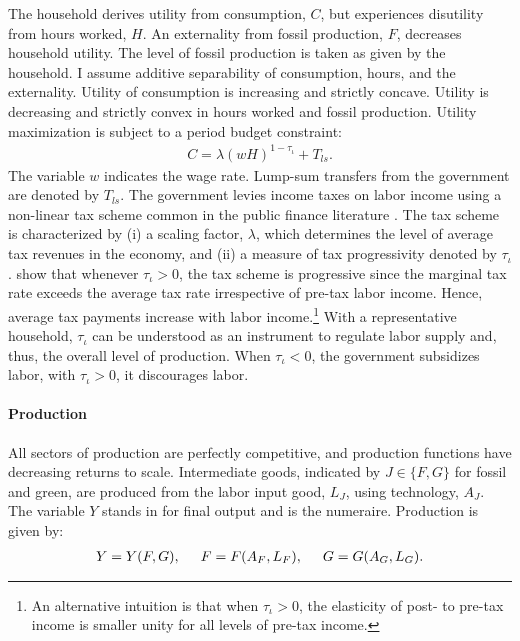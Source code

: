 The household derives utility from consumption, $C$, but experiences disutility from hours worked, $H$. An externality from fossil production, $F$, decreases household utility. The level of fossil production is taken as given by the household.
I assume additive separability of consumption, hours, and the externality. Utility of consumption is increasing and strictly concave. Utility is decreasing and strictly convex in hours worked and fossil production.
Utility maximization is subject to a period budget constraint:
\begin{align}
	 C= \lambda(wH)^{1-\tau_{\iota}}+T_{ls}. \label{eq:hhbudget}
\end{align}
The variable $w$ indicates the wage rate.  Lump-sum transfers from the government are denoted by $T_{ls}$.
The government levies income taxes on labor income using a non-linear tax scheme common in the public finance literature \citep{Heathcote2017OptimalFramework, Benabou2002TaxEfficiency}. The tax scheme is
characterized by (i) a scaling factor, $\lambda$, which determines the level of average tax revenues in the economy, and (ii) a measure of tax progressivity denoted by $\tau_{\iota}$. 
\cite{Heathcote2017OptimalFramework} show that whenever $\tau_{\iota}>0$, the tax scheme is progressive since the marginal tax rate exceeds the average tax rate irrespective of  pre-tax labor income. Hence, average tax payments increase with labor income.\footnote{ An alternative intuition is that when $\tau_{\iota}>0$, the elasticity of post- to pre-tax  income is smaller unity for all levels of pre-tax income.  } %
With a representative household, $\tau_{\iota}$ can be understood as an instrument to regulate labor supply and, thus, the overall level of production. When $\tau_{\iota}<0$, the government subsidizes labor, with $\tau_{\iota}>0$, it discourages labor. 

\paragraph{Production}
All sectors of production are perfectly competitive, and production functions have decreasing returns to scale. %
Intermediate goods, indicated by $J\in \{F,G\}$ for fossil and green, are produced from the labor input good, $L_J$, using technology, $A_J$. The variable $Y$ stands in for final output and is the numeraire. Production is given by:
\begin{align}
Y=Y(F, G), \hspace{5mm} F=F(A_F, L_F),\hspace{5mm} G=G(A_G, L_G). \label{eq:prod}
\end{align}


